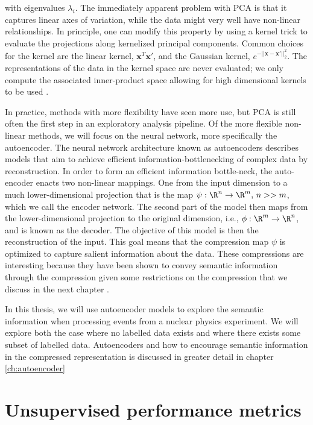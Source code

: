 \noindent with eigenvalues $\lambda_i$. The immediately apparent problem with PCA is that it captures linear axes of variation, while the data might very well have non-linear relationships. In principle, one can modify this property by using a kernel trick to evaluate the projections along kernelized principal components. Common choices for the kernel are the linear kernel, $\boldsymbol{x}^T\boldsymbol{x}'$, and the Gaussian kernel, $e^{-||\boldsymbol{x} - \boldsymbol{x}'||^2_2}$. The representations of the data in the kernel space are never evaluated; we only compute the associated inner-product space allowing for high dimensional kernels to be used \cite{Scholkopf1996}. 

In practice, methods with more flexibility have seen more use, but PCA is still often the first step in an exploratory analysis pipeline. Of the more flexible non-linear methods, we will focus on the neural network, more specifically the autoencoder. The neural network architecture known as autoencoders describes models that aim to achieve efficient information-bottlenecking of complex data by reconstruction. In order to form an efficient information bottle-neck, the auto-encoder enacts two non-linear mappings. One from the input dimension to a much lower-dimensional projection that is the map $\psi: \R^n \rightarrow \R^m,\, n >> m$, which we call the encoder network. The second part of the model then maps from the lower-dimensional projection to the original dimension, i.e., $\phi: \R^m \rightarrow \R^n$, and is known as the decoder. The objective of this model is then the reconstruction of the input. This goal means that the compression map $\psi$ is optimized to capture salient information about the data. These compressions are interesting because they have been shown to convey semantic information through the compression given some restrictions on the compression that we discuss in the next chapter \cite{Fertig}.

In this thesis, we will use autoencoder models to explore the semantic information when processing events from a nuclear physics experiment. We will explore both the case where no labelled data exists and where there exists some subset of labelled data. Autoencoders and how to encourage semantic information in the compressed representation is discussed in greater detail in chapter \ref{ch:autoencoder}

\section{Unsupervised performance metrics}\label{sec:unsupervised_perf}

